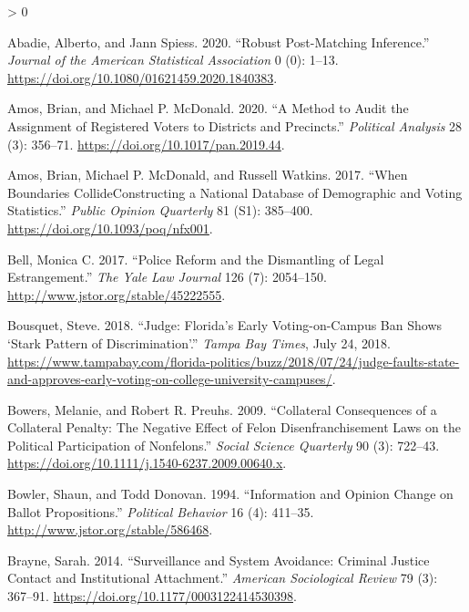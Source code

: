 \documentclass[
  12pt,
]{article}
\newlength{\cslhangindent}
\newenvironment{CSLReferences}[2] %
 {%
  \setlength{\parindent}{0pt}
  \ifodd #1 \everypar{\setlength{\hangindent}{\cslhangindent}}\ignorespaces\fi
  \ifnum #2 > 0
  \setlength{\parskip}{#2\baselineskip}
  \fi
 }%
 {}
\begin{document}
\hypertarget{refs}{}
\begin{CSLReferences}{1}{0}
\leavevmode\hypertarget{ref-Abadie2020}{}%
Abadie, Alberto, and Jann Spiess. 2020. {``Robust {Post}-{Matching Inference}.''} \emph{Journal of the American Statistical Association} 0 (0): 1--13. \url{https://doi.org/10.1080/01621459.2020.1840383}.

\leavevmode\hypertarget{ref-Amos2020}{}%
Amos, Brian, and Michael P. McDonald. 2020. {``A {Method} to {Audit} the {Assignment} of {Registered Voters} to {Districts} and {Precincts}.''} \emph{Political Analysis} 28 (3): 356--71. \url{https://doi.org/10.1017/pan.2019.44}.

\leavevmode\hypertarget{ref-Amos2017}{}%
Amos, Brian, Michael P. McDonald, and Russell Watkins. 2017. {``When {Boundaries CollideConstructing} a {National Database} of {Demographic} and {Voting Statistics}.''} \emph{Public Opinion Quarterly} 81 (S1): 385--400. \url{https://doi.org/10.1093/poq/nfx001}.

\leavevmode\hypertarget{ref-Bell2017}{}%
Bell, Monica C. 2017. {``Police {Reform} and the {Dismantling} of {Legal Estrangement}.''} \emph{The Yale Law Journal} 126 (7): 2054--150. \url{http://www.jstor.org/stable/45222555}.

\leavevmode\hypertarget{ref-Bousquet2018a}{}%
Bousquet, Steve. 2018. {``Judge: {Florida}'s Early Voting-on-Campus Ban Shows {`Stark Pattern of Discrimination'}.''} \emph{Tampa Bay Times}, July 24, 2018. \url{https://www.tampabay.com/florida-politics/buzz/2018/07/24/judge-faults-state-and-approves-early-voting-on-college-university-campuses/}.

\leavevmode\hypertarget{ref-Bowers2009}{}%
Bowers, Melanie, and Robert R. Preuhs. 2009. {``Collateral {Consequences} of a {Collateral Penalty}: {The Negative Effect} of {Felon Disenfranchisement Laws} on the {Political Participation} of {Nonfelons}.''} \emph{Social Science Quarterly} 90 (3): 722--43. \url{https://doi.org/10.1111/j.1540-6237.2009.00640.x}.

\leavevmode\hypertarget{ref-Bowler1994}{}%
Bowler, Shaun, and Todd Donovan. 1994. {``Information and {Opinion Change} on {Ballot Propositions}.''} \emph{Political Behavior} 16 (4): 411--35. \url{http://www.jstor.org/stable/586468}.

\leavevmode\hypertarget{ref-Brayne2014}{}%
Brayne, Sarah. 2014. {``Surveillance and {System Avoidance}: {Criminal Justice Contact} and {Institutional Attachment}.''} \emph{American Sociological Review} 79 (3): 367--91. \url{https://doi.org/10.1177/0003122414530398}.


\end{CSLReferences}
\end{document}
